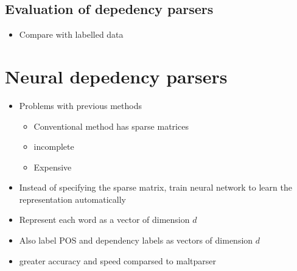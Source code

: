 \documentclass[a4paper]{article}
\begin{document}
\subsection{Evaluation of depedency parsers}
\begin{itemize}
    \item Compare with labelled data
\end{itemize}
\section{Neural depedency parsers}
\begin{itemize}
    \item Problems with previous methods
    \begin{itemize}
        \item Conventional method has sparse matrices
        \item incomplete
        \item Expensive
    \end{itemize}
    \item Instead of specifying the sparse matrix, train neural network to learn the representation automatically
    \item Represent each word as a vector of dimension $d$
    \item Also label POS and dependency labels as vectors of dimension $d$
    \item greater accuracy and speed comparsed to maltparser
\end{itemize}
\end{document}
